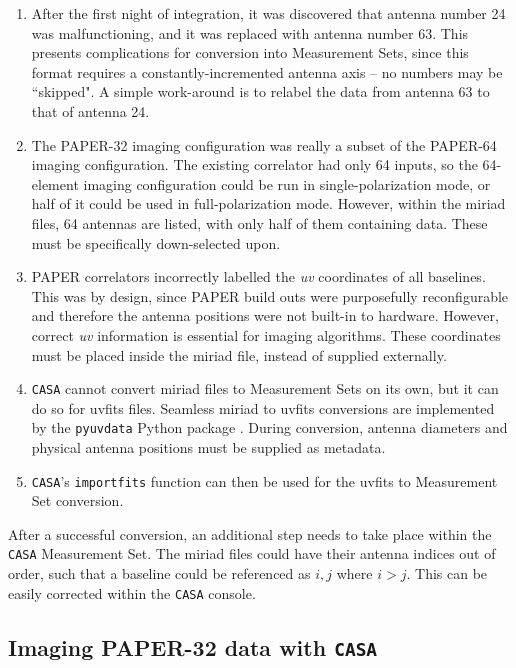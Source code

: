 \begin{enumerate}
\item After the first night of integration, it was discovered that antenna number 24 was malfunctioning, and it was replaced with antenna number 63. This presents complications for conversion into Measurement Sets, since this format requires a constantly-incremented antenna axis -- no numbers may be ``skipped". A simple work-around is to relabel the data from antenna 63 to that of antenna 24.
\item The PAPER-32 imaging configuration was really a subset of the PAPER-64 imaging configuration. The existing correlator had only 64 inputs, so the 64-element imaging configuration could be run in single-polarization mode, or half of it could be used in full-polarization mode. However, within the {\sc miriad} files, 64 antennas are listed, with only half of them containing data. These must be specifically down-selected upon.
\item PAPER correlators incorrectly labelled the \textit{uv} coordinates of all baselines. This was by design, since PAPER build outs were purposefully reconfigurable and therefore the antenna positions were not built-in to hardware. However, correct \textit{uv} information is essential for imaging algorithms. These coordinates must be placed inside the {\sc miriad} file, instead of supplied externally.
\item {\tt CASA} cannot convert {\sc miriad} files to Measurement Sets on its own, but it can do so for {\sc uvfits} files. Seamless {\sc miriad} to {\sc uvfits} conversions are implemented by the {\tt pyuvdata} Python package \citep{pyuvdata}. During conversion, antenna diameters and physical antenna positions must be supplied as metadata.
\item {\tt CASA}'s {\tt importfits} function can then be used for the {\sc uvfits} to Measurement Set conversion.
\end{enumerate}

After a successful conversion, an additional step needs to take place within the {\tt CASA} Measurement Set. The {\sc miriad} files could have their antenna indices out of order, such that a baseline could be referenced as $i,j$ where $i>j$. This can be easily corrected within the {\tt CASA} console.

\subsection{Imaging PAPER-32 data with {\tt CASA}}

